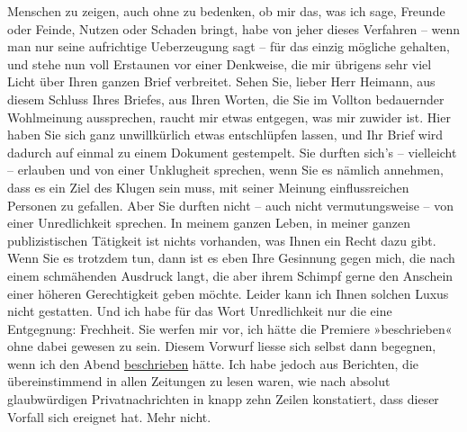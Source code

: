 \begin{ledgroupsized}[t]{13cm}
               Menschen zu zeigen, auch ohne zu bedenken, ob mir das, was ich sage, Freunde oder
               Feinde, Nutzen oder Schaden bringt, habe von jeher dieses Verfahren – wenn man nur
               seine aufrichtige Ueberzeugung sagt – für das einzig mögliche gehalten, und stehe nun
               voll Erstaunen vor einer Denkweise, die mir übrigens sehr viel Licht über Ihren
               ganzen Brief verbreitet.\pend
           \pstart
           Sehen Sie, lieber Herr Heimann, aus diesem
               Schluss Ihres Briefes, aus Ihren Worten, die Sie im Vollton bedauernder Wohlmeinung
               aussprechen, raucht mir etwas entgegen, was mir zuwider ist. Hier haben Sie sich ganz unwillkürlich etwas
               entschlüpfen lassen, und Ihr Brief wird dadurch auf einmal zu einem Dokument
               gestempelt.\pend
           \pstart
           Sie durften sich’s – vielleicht – erlauben und von einer Unklugheit sprechen, wenn
               Sie es nämlich annehmen, dass es ein Ziel des Klugen sein muss, mit seiner Meinung
               einflussreichen Personen zu gefallen. Aber Sie durften nicht – auch nicht
               vermutungsweise – von einer Unredlichkeit sprechen. In meinem ganzen Leben, in mei{\pb}ner ganzen publizistischen
               Tätigkeit ist nichts vorhanden, was Ihnen ein Recht dazu gibt. Wenn Sie es trotzdem
               tun, dann ist es eben Ihre Gesinnung gegen mich, die nach einem schmähenden Ausdruck
               langt, die aber ihrem Schimpf gerne den Anschein einer höheren Gerechtigkeit geben
               möchte. Leider kann ich Ihnen solchen Luxus nicht gestatten. Und ich habe für das
               Wort Unredlichkeit nur die eine Entgegnung: Frechheit.\pend
           \pstart
           Sie werfen mir vor, ich hätte die Premiere »beschrieben« ohne dabei gewesen zu sein. Diesem Vorwurf liesse
               sich selbst dann begegnen, wenn ich den Abend \uline{beschrieben} hätte. Ich habe jedoch aus Berichten, die übereinstimmend in
               allen Zeitungen zu lesen waren, wie nach absolut glaubwürdigen Privatnachrichten in
               knapp zehn Zeilen konstatiert, dass dieser Vorfall sich ereignet hat. Mehr nicht.

\end{ledgroupsized}
